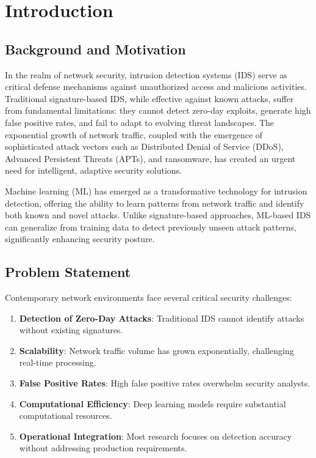 \documentclass[12pt,a4paper]{article}
\begin{document}
\section{Introduction}

\subsection{Background and Motivation}

In the realm of network security, intrusion detection systems (IDS) serve as critical defense mechanisms against unauthorized access and malicious activities. Traditional signature-based IDS, while effective against known attacks, suffer from fundamental limitations: they cannot detect zero-day exploits, generate high false positive rates, and fail to adapt to evolving threat landscapes. The exponential growth of network traffic, coupled with the emergence of sophisticated attack vectors such as Distributed Denial of Service (DDoS), Advanced Persistent Threats (APTs), and ransomware, has created an urgent need for intelligent, adaptive security solutions.

Machine learning (ML) has emerged as a transformative technology for intrusion detection, offering the ability to learn patterns from network traffic and identify both known and novel attacks. Unlike signature-based approaches, ML-based IDS can generalize from training data to detect previously unseen attack patterns, significantly enhancing security posture.

\subsection{Problem Statement}

Contemporary network environments face several critical security challenges:

\begin{enumerate}[label=\arabic*.]
    \item \textbf{Detection of Zero-Day Attacks}: Traditional IDS cannot identify attacks without existing signatures.
    \item \textbf{Scalability}: Network traffic volume has grown exponentially, challenging real-time processing.
    \item \textbf{False Positive Rates}: High false positive rates overwhelm security analysts.
    \item \textbf{Computational Efficiency}: Deep learning models require substantial computational resources.
    \item \textbf{Operational Integration}: Most research focuses on detection accuracy without addressing production requirements.
\end{enumerate}
\end{document}
